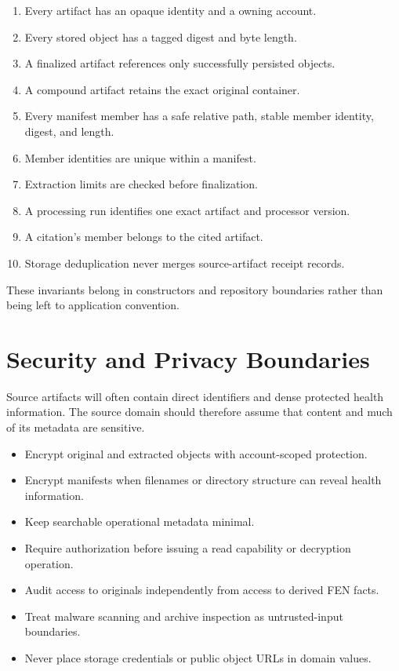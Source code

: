 \documentclass[11pt]{article}
\begin{document}
\begin{enumerate}
  \item Every artifact has an opaque identity and a owning account.
  \item Every stored object has a tagged digest and byte length.
  \item A finalized artifact references only successfully persisted objects.
  \item A compound artifact retains the exact original container.
  \item Every manifest member has a safe relative path, stable member identity, digest, and length.
  \item Member identities are unique within a manifest.
  \item Extraction limits are checked before finalization.
  \item A processing run identifies one exact artifact and processor version.
  \item A citation's member belongs to the cited artifact.
  \item Storage deduplication never merges source-artifact receipt records.
\end{enumerate}

These invariants belong in constructors and repository boundaries rather than being left to application convention.

\Needspace{0.28\textheight}
\section{Security and Privacy Boundaries}

Source artifacts will often contain direct identifiers and dense protected health information. The source domain should therefore assume that content and much of its metadata are sensitive.

\begin{itemize}
  \item Encrypt original and extracted objects with account-scoped protection.
  \item Encrypt manifests when filenames or directory structure can reveal health information.
  \item Keep searchable operational metadata minimal.
  \item Require authorization before issuing a read capability or decryption operation.
  \item Audit access to originals independently from access to derived FEN facts.
  \item Treat malware scanning and archive inspection as untrusted-input boundaries.
  \item Never place storage credentials or public object URLs in domain values.
\end{itemize}
\end{document}
